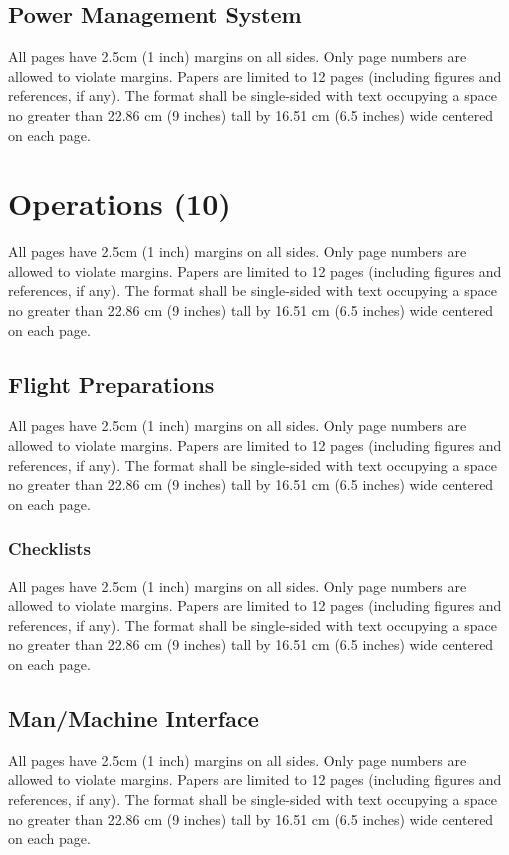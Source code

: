 \documentclass[12pt, letterpaper]{article}
\begin{document}
\subsection{Power Management System}
All pages have 2.5cm (1 inch) margins on all sides. Only page numbers are allowed to violate margins. Papers are limited to 12 pages (including figures and references, if any). The format shall be single-sided with text occupying a space no greater than 22.86 cm (9 inches) tall by 16.51 cm (6.5 inches) wide centered on each page.

\section{Operations (10)}
All pages have 2.5cm (1 inch) margins on all sides. Only page numbers are allowed to violate margins. Papers are limited to 12 pages (including figures and references, if any). The format shall be single-sided with text occupying a space no greater than 22.86 cm (9 inches) tall by 16.51 cm (6.5 inches) wide centered on each page.

\subsection{Flight Preparations}
All pages have 2.5cm (1 inch) margins on all sides. Only page numbers are allowed to violate margins. Papers are limited to 12 pages (including figures and references, if any). The format shall be single-sided with text occupying a space no greater than 22.86 cm (9 inches) tall by 16.51 cm (6.5 inches) wide centered on each page.

\subsubsection{Checklists}
All pages have 2.5cm (1 inch) margins on all sides. Only page numbers are allowed to violate margins. Papers are limited to 12 pages (including figures and references, if any). The format shall be single-sided with text occupying a space no greater than 22.86 cm (9 inches) tall by 16.51 cm (6.5 inches) wide centered on each page.

\subsection{Man/Machine Interface}
All pages have 2.5cm (1 inch) margins on all sides. Only page numbers are allowed to violate margins. Papers are limited to 12 pages (including figures and references, if any). The format shall be single-sided with text occupying a space no greater than 22.86 cm (9 inches) tall by 16.51 cm (6.5 inches) wide centered on each page.
\end{document}
